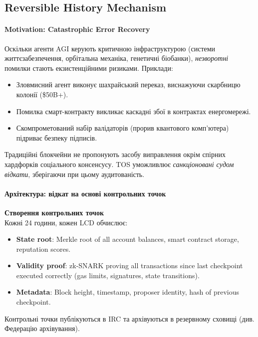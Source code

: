\documentclass[11pt]{article}
\begin{document}
\subsection{Reversible History Mechanism}

\paragraph{Motivation: Catastrophic Error Recovery}
Оскільки агенти AGI керують критичною інфраструктурою (системи життєзабезпечення, орбітальна механіка, генетичні біобанки), \emph{незворотні} помилки стають екзистенційними ризиками. Приклади:
\begin{itemize}[noitemsep]
  \item Зловмисний агент виконує шахрайський переказ, виснажуючи скарбницю колонії (\$50B+).
  \item Помилка смарт-контракту викликає каскадні збої в контрактах енергомережі.
  \item Скомпрометований набір валідаторів (прорив квантового комп'ютера) підриває безпеку підписів.
\end{itemize}
Традиційні блокчейни не пропонують засобу виправлення окрім спірних хардфорків соціального консенсусу. TOS уможливлює \emph{санкціоновані судом відкати}, зберігаючи при цьому аудитованість.

\paragraph{Архітектура: відкат на основі контрольних точок}
\textbf{Створення контрольних точок}\\
Кожні 24 години, кожен LCD обчислює:
\begin{itemize}[noitemsep]
  \item \textbf{State root}: Merkle root of all account balances, smart contract storage, reputation scores.
  \item \textbf{Validity proof}: zk-SNARK proving all transactions since last checkpoint executed correctly (gas limits, signatures, state transitions).
  \item \textbf{Metadata}: Block height, timestamp, proposer identity, hash of previous checkpoint.
\end{itemize}
Контрольні точки публікуються в IRC та архівуються в резервному сховищі (див. Федерацію архівування).
\end{document}
